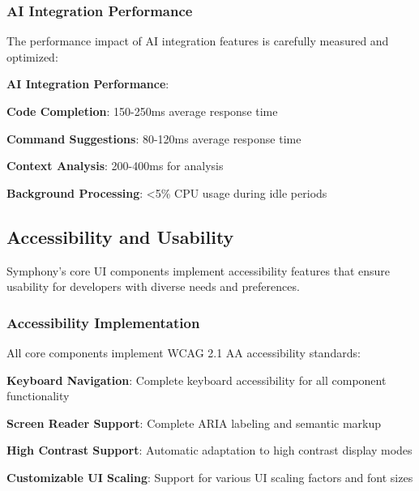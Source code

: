 \subsubsection*{AI Integration Performance}

The performance impact of AI integration features is carefully measured and optimized:

\begin{alertbox}
\textbf{AI Integration Performance}:
\begin{compactlist}
    \item \textbf{Code Completion}: 150-250ms average response time
    \item \textbf{Command Suggestions}: 80-120ms average response time
    \item \textbf{Context Analysis}: 200-400ms for analysis
    \item \textbf{Background Processing}: <5\% CPU usage during idle periods
\end{compactlist}
\end{alertbox}

\subsection*{Accessibility and Usability}

Symphony's core UI components implement accessibility features that ensure usability for developers with diverse needs and preferences.

\subsubsection*{Accessibility Implementation}

All core components implement WCAG 2.1 AA accessibility standards:

\begin{compactlist}
    \item \textbf{Keyboard Navigation}: Complete keyboard accessibility for all component functionality
    \item \textbf{Screen Reader Support}: Complete ARIA labeling and semantic markup
    \item \textbf{High Contrast Support}: Automatic adaptation to high contrast display modes
    \item \textbf{Customizable UI Scaling}: Support for various UI scaling factors and font sizes
\end{compactlist}

